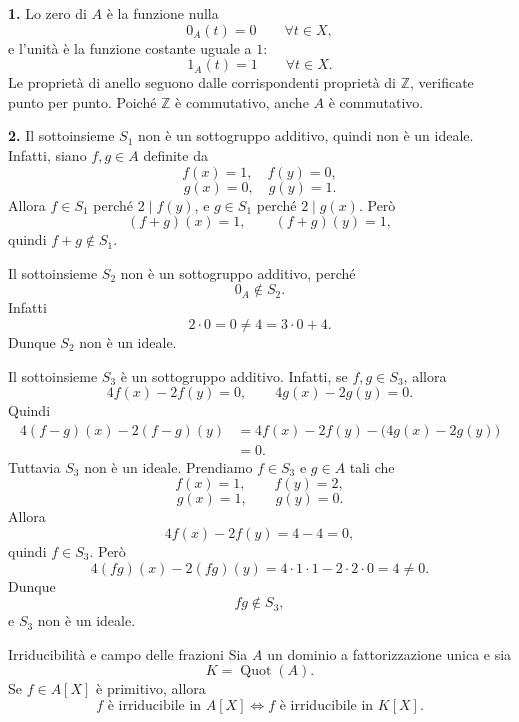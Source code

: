 \documentclass[a4paper]{article}
\begin{document}
\begin{radioactive}
\begin{snippetsolution}{}
    \textbf{1.}
    Lo zero di \(A\) è la funzione nulla
    \[
        0_A(t)=0
        \qquad
        \forall t\in X,
    \]
    e l'unità è la funzione costante uguale a \(1\):
    \[
        1_A(t)=1
        \qquad
        \forall t\in X.
    \]
    Le proprietà di anello seguono dalle corrispondenti proprietà di \(\mathbb{Z}\), verificate punto per punto.
    Poiché \(\mathbb{Z}\) è commutativo, anche \(A\) è commutativo.

    \textbf{2.}
    Il sottoinsieme \(S_1\) non è un sottogruppo additivo, quindi non è un ideale.
    Infatti, siano \(f,g\in A\) definite da
    \[
        f(x)=1,\quad f(y)=0,
    \]
    \[
        g(x)=0,\quad g(y)=1.
    \]
    Allora \(f\in S_1\) perché \(2\mid f(y)\), e \(g\in S_1\) perché \(2\mid g(x)\).
    Però
    \[
        (f+g)(x)=1,
        \qquad
        (f+g)(y)=1,
    \]
    quindi \(f+g\notin S_1\).

    Il sottoinsieme \(S_2\) non è un sottogruppo additivo, perché
    \[
        0_A\notin S_2.
    \]
    Infatti
    \[
        2\cdot 0=0
        \neq
        4
        =
        3\cdot 0+4.
    \]
    Dunque \(S_2\) non è un ideale.

    Il sottoinsieme \(S_3\) è un sottogruppo additivo.
    Infatti, se \(f,g\in S_3\), allora
    \[
        4f(x)-2f(y)=0,
        \qquad
        4g(x)-2g(y)=0.
    \]
    Quindi
    \begin{align*}
        4(f-g)(x)-2(f-g)(y)
        &=
        4f(x)-2f(y)-\big(4g(x)-2g(y)\big) \\
        &=
        0.
    \end{align*}
    Tuttavia \(S_3\) non è un ideale.
    Prendiamo \(f\in S_3\) e \(g\in A\) tali che
    \[
        f(x)=1,
        \qquad
        f(y)=2,
    \]
    \[
        g(x)=1,
        \qquad
        g(y)=0.
    \]
    Allora
    \[
        4f(x)-2f(y)=4-4=0,
    \]
    quindi \(f\in S_3\). Però
    \[
        4(fg)(x)-2(fg)(y)
        =
        4\cdot 1\cdot 1-2\cdot 2\cdot 0
        =
        4\neq 0.
    \]
    Dunque
    \[
        fg\notin S_3,
    \]
    e \(S_3\) non è un ideale.
\end{snippetsolution}
\end{radioactive}

\pagebreak

\begin{snippetcorollary}{Irriducibilità e campo delle frazioni}
    Sia \(A\) un dominio a fattorizzazione unica e sia
    \[
        K=\operatorname{Quot}(A).
    \]
    Se \(f\in A[X]\) è primitivo, allora
    \[
        f \text{ è irriducibile in } A[X]
        \iff
        f \text{ è irriducibile in } K[X].
    \]
\end{snippetcorollary}
\end{document}
